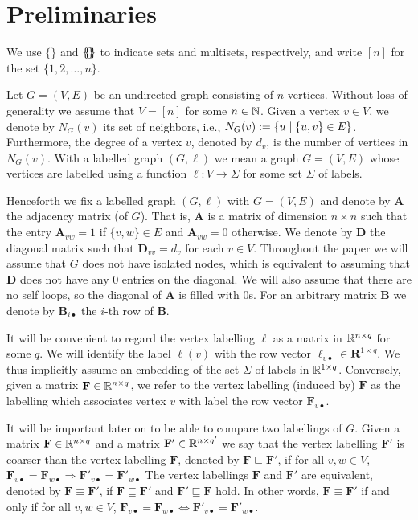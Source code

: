 \section{Preliminaries}
We use $\{\!\}$ and $\{\!\!\{\! \}\!\!\}$ to indicate sets and multisets,
respectively, and write $[n]$ for the set $\{1,2,\ldots,n\}$.

Let $G=(V,E)$ be an undirected graph consisting of $n$ vertices. Without loss
of generality we assume that $V=[n]$ for some $n\in\mathbb{N}$. Given a vertex $v\in
V$, we denote by $N_G(v)$ its set of neighbors, i.e., $N_G(v):=\{u\mathrel{\mid}
\{u,v\}\in E\}$. Furthermore, the degree of a vertex $v$, denoted by $d_{v}$,
is the number of vertices in $N_G(v)$. With a labelled graph $(G,\pmb{\ell})$
we mean a graph $G=(V,E)$ whose vertices are labelled using a function
$\pmb{\ell}:V\to \Sigma$ for some set $\Sigma$ of labels. 

Henceforth we fix a labelled graph $(G,\pmb{\ell})$ with $G=(V,E)$ and denote
by $\mathbf{A}$ the adjacency matrix (of $G$). That is, $\mathbf{A}$ is a
matrix of dimension $n \times n$ such that the entry $\mathbf{A}_{vw}=1$ if
$\{v,w\}\in E$ and $\mathbf{A}_{vw}=0$ otherwise. We denote by $\mathbf{D}$
the diagonal matrix such that $\mathbf{D}_{vv}=d_v$ for each $v\in V$.
Throughout the paper we will assume that $G$ does not have isolated nodes,
which is equivalent to assuming that $\mathbf{D}$ does not have any $0$
entries on the diagonal. We will also assume that there are no self loops, so
the diagonal of $\mathbf{A}$ is filled with $0$s. For an arbitrary matrix
$\mathbf{B}$ we denote by $\mathbf{B}_{i\bullet}$ the $i$-th row of
$\mathbf{B}$.

It will be convenient to regard the vertex labelling $\pmb{\ell}$ as a matrix
in $\mathbb{R}^{n\times q}$ for some $q$. We will identify the label $\pmb{\ell}(v)$
with the row vector $\pmb{\ell}_{v\bullet}\in\mathbf{R}^{1\times q}$. We thus
implicitly assume an embedding of the set $\Sigma$ of labels in $\mathbb{R}^{1\times
q}$. Conversely, given a matrix $\mathbf{F} \in \mathbb{R}^{n \times q}$, we refer to
the vertex labelling (induced by) $\mathbf{F}$ as the labelling which
associates vertex $v$ with label the row vector $\mathbf{F}_{v\bullet}$.

It will be important later on to be able to compare two labellings of $G$.
Given a matrix $\mathbf{F} \in \mathbb{R}^{n\times q}$ and a matrix $\mathbf{F}' \in
\mathbb{R}^{n\times q'}$ we say that the vertex labelling  $\mathbf{F}'$ is coarser
than the vertex labelling $\mathbf{F}$, denoted by $\mathbf{F}\sqsubseteq
\mathbf{F}'$, if for all $v,w\in V$, $
\mathbf{F}_{v\bullet}=\mathbf{F}_{w\bullet} \Rightarrow
\mathbf{F}'_{v\bullet}=\mathbf{F}'_{w\bullet} $ The vertex labellings
$\mathbf{F}$ and $\mathbf{F}'$ are equivalent, denoted by
$\mathbf{F}\equiv\mathbf{F}'$, if $\mathbf{F}\sqsubseteq \mathbf{F}'$ and
$\mathbf{F}'\sqsubseteq \mathbf{F}$ hold. In other words,
$\mathbf{F}\equiv\mathbf{F}'$ if and only if for all $v,w\in V$, $
\mathbf{F}_{v\bullet}=\mathbf{F}_{w\bullet} \Leftrightarrow
\mathbf{F}'_{v\bullet}=\mathbf{F}'_{w\bullet} $.

